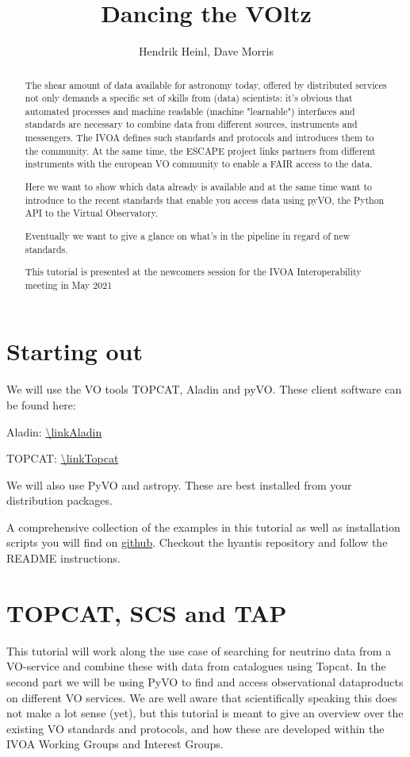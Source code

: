 \documentclass[twoside]{article}[12pt]
\title {Dancing the VOltz}
\author {Hendrik Heinl, Dave Morris}
\begin{document}


\maketitle

\pagebreak
\begin {abstract}
The shear amount of data available for astronomy today, offered by
distributed services not only demands a specific set of skills from
(data) scientists: it's obvious that automated processes and machine
readable (machine "learnable") interfaces and standards are necessary to
combine data from different sources, instruments and messengers. The
IVOA defines such standards and protocols and introduces them to the
community. At the same time, the ESCAPE project links partners from
different instruments with the european VO community to enable a FAIR
access to the data.

Here we want to show which data already is available and at the same time want
to introduce to the recent standards that enable you access data using
pyVO, the Python API to the Virtual Observatory.

Eventually we want to give a glance on what's in the pipeline in regard
of new standards.

This tutorial is presented at the newcomers session for the IVOA
Interoperability meeting in May 2021\end{abstract}


\section{Starting out}
We will use the VO tools TOPCAT, Aladin and pyVO. These client
software can be found here:

Aladin: \url{\linkAladin}

TOPCAT: \url{\linkTopcat}

We will also use PyVO and astropy. These are best installed from your
distribution packages. 

A comprehensive collection of the examples in this tutorial as well as
installation scripts you will find on
\href{https://github.com/hendhd/hyantis}{github}. Checkout the hyantis
repository and follow the README instructions. 

\section {TOPCAT, SCS and TAP}
This tutorial will work along the use case of searching for neutrino
data from a VO-service and combine these with data from catalogues using
Topcat. In the second part we will be using PyVO to find and access
observational dataproducts on different VO services.
We are well aware that scientifically speaking this does not make a lot
sense (yet), but this tutorial is meant to give an overview over the
existing VO standards and protocols, and how these are developed within
the IVOA Working Groups and Interest Groups. 
\end{document}
